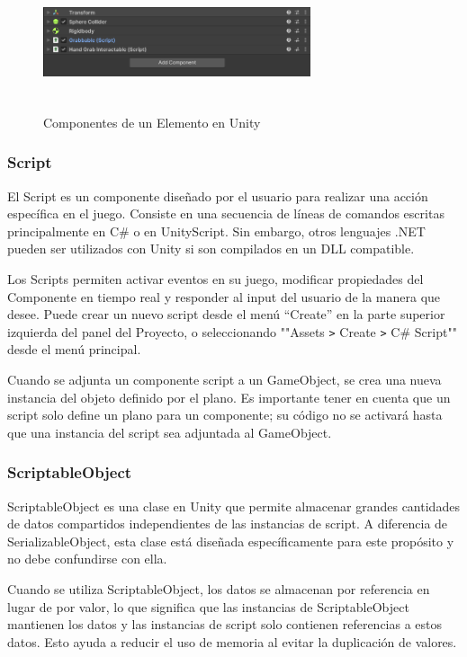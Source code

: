 \begin{figure}[thbp]
    \centering
    \includegraphics[width=0.7\textwidth, height = 4cm]{img/chapter03/Components.png}
    \caption{Componentes de un Elemento en Unity}
    \label{fig:components}
\end{figure}

\subsubsection{Script}
El Script es un componente diseñado por el usuario para realizar una acción específica en el juego. Consiste en una secuencia de líneas de comandos escritas principalmente en C\# o en UnityScript. Sin embargo, otros lenguajes .NET pueden ser utilizados con Unity si son compilados en un DLL compatible.

Los Scripts permiten activar eventos en su juego, modificar propiedades del Componente en tiempo real y responder al input del usuario de la manera que desee. Puede crear un nuevo script desde el menú ``Create'' en la parte superior izquierda del panel del Proyecto, o seleccionando ""Assets \verb|>| Create \verb|>| C\# Script"" desde el menú principal.

Cuando se adjunta un componente script a un GameObject, se crea una nueva instancia del objeto definido por el plano. Es importante tener en cuenta que un script solo define un plano para un componente; su código no se activará hasta que una instancia del script sea adjuntada al GameObject.

\subsubsection{ScriptableObject}
ScriptableObject es una clase en Unity que permite almacenar grandes cantidades de datos compartidos independientes de las instancias de script. A diferencia de SerializableObject, esta clase está diseñada específicamente para este propósito y no debe confundirse con ella.

Cuando se utiliza ScriptableObject, los datos se almacenan por referencia en lugar de por valor, lo que significa que las instancias de ScriptableObject mantienen los datos y las instancias de script solo contienen referencias a estos datos. Esto ayuda a reducir el uso de memoria al evitar la duplicación de valores.

